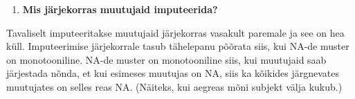 \documentclass[]{book}
\newenvironment{Shaded}{\begin{snugshade}}{\end{snugshade}}
\newcommand{\KeywordTok}[1]{\textcolor[rgb]{0.13,0.29,0.53}{\textbf{#1}}}
\newcommand{\DataTypeTok}[1]{\textcolor[rgb]{0.13,0.29,0.53}{#1}}
\newcommand{\DecValTok}[1]{\textcolor[rgb]{0.00,0.00,0.81}{#1}}
\newcommand{\StringTok}[1]{\textcolor[rgb]{0.31,0.60,0.02}{#1}}
\newcommand{\OtherTok}[1]{\textcolor[rgb]{0.56,0.35,0.01}{#1}}
\newcommand{\OperatorTok}[1]{\textcolor[rgb]{0.81,0.36,0.00}{\textbf{#1}}}
\newcommand{\NormalTok}[1]{#1}
\providecommand{\tightlist}{%
  \setlength{\itemsep}{0pt}\setlength{\parskip}{0pt}}
\begin{document}
\begin{Shaded}
\end{Shaded}

\begin{enumerate}
\def\labelenumi{\arabic{enumi}.}
\setcounter{enumi}{4}
\tightlist
\item
  \textbf{Mis järjekorras muutujaid imputeerida?}
\end{enumerate}

Tavaliselt imputeeritakse muutujaid järjekorras vasakult paremale ja see
on hea küll. Imputeerimise järjekorrale tasub tähelepanu põõrata siis,
kui NA-de muster on monotooniline. NA-de muster on monotooniline siis,
kui muutujaid saab järjestada nõnda, et kui esimeses muutujas on NA,
siis ka kõikides järgnevates muutujates on selles reas NA. (Näiteks, kui
aegreas mõni subjekt välja kukub.)
\end{document}
